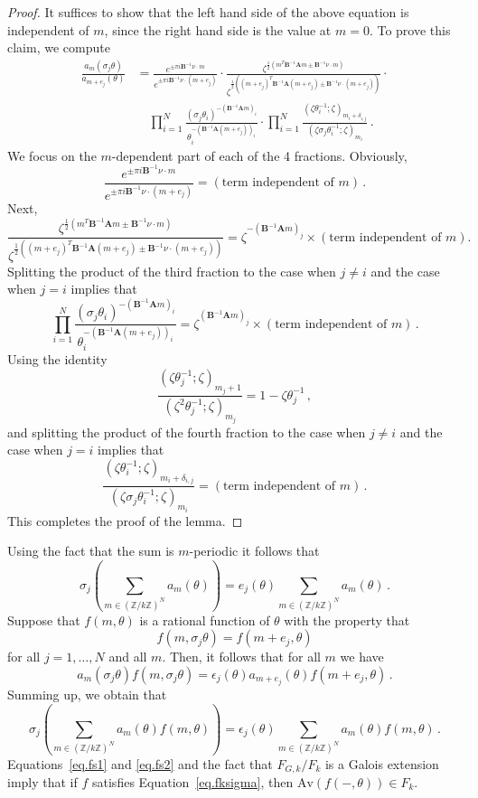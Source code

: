 \documentclass[12pt]{amsart}
\theoremstyle{definition}
\def\BZ{\mathbb Z}
\def\e{\epsilon}
\def\th{\theta}
\def\be{  \begin{equation} }
\def\ee{  \end{equation} }
\def\Av{\mathrm{Av}}
\newcommand{\mb}{\mathbf}
\begin{document}
\begin{proof}
It suffices to show that the left hand side of the above equation is
independent of $m$, since the right hand side is the value at $m=0$.
To prove this claim, we compute
\begin{align*}
\frac{a_{m}(\sigma_j\th)}{a_{m+e_j}(\th)} &=
\frac{e^{\pm \pi i \mb B^{-1}\nu \cdot m}}{
e^{\pm \pi i \mb B^{-1}\nu \cdot (m+e_j)}} \cdot
\frac{\zeta^{\frac12 \left(m^T\mb B^{-1}\mb A m \pm \mb B^{-1}\nu \cdot m\right)}}{
\zeta^{\frac12 \left((m+e_j)^T\mb B^{-1}\mb A (m+e_j) \pm \mb B^{-1}\nu \cdot (m+e_j)\right)}} 
\cdot \\ 
& \quad \prod_{i=1}^N \frac{(\sigma_j \th_i)^{-(\mb B^{-1} \mb A m)_i}}{
\th_i^{-(\mb B^{-1} \mb A (m+e_j))_i}} \cdot \prod_{i=1}^N
\frac{(\zeta \th_i^{-1};\zeta )_{m_i+\delta_{i,j}}}{
(\zeta \sigma_j \th_i^{-1};\zeta )_{m_i}}\,.
\end{align*}
We focus on the $m$-dependent part of each of the 4 fractions.
Obviously, 
$$
\frac{e^{\pm \pi i \mb B^{-1}\nu \cdot m}}{
e^{\pm \pi i \mb B^{-1}\nu \cdot (m+e_j)}} =
\left(\text{term independent of $m$}\right) \,.
$$
Next,
$$
\frac{\zeta^{\frac12 \left(m^T\mb B^{-1}\mb A m \pm \mb B^{-1}\nu 
\cdot m\right)}}{
\zeta^{\frac12 \left((m+e_j)^T\mb B^{-1}\mb A (m+e_j) \pm \mb B^{-1}\nu 
\cdot (m+e_j)\right)}} = \zeta^{-(\mb B^{-1}\mb A m)_j} \times 
\left(\text{term independent of $m$}\right).
$$
Splitting the product of the third fraction to the case when $j \neq i$
and the case when $j=i$ implies that
$$
\prod_{i=1}^N \frac{(\sigma_j \th_i)^{-(\mb B^{-1} \mb A m)_i}}{
\th_i^{-(\mb B^{-1} \mb A (m+e_j))_i}} 
= \zeta^{(\mb B^{-1}\mb A m)_j} \times 
\left(\text{term independent of $m$}\right) \,.
$$
Using the identity 
$$
\frac{(\zeta \th_j^{-1};\zeta)_{m_j+1}}{(\zeta^2 \th_j^{-1};\zeta)_{m_j}}=
1-\zeta \th_j^{-1} \,,
$$
and splitting the product of the fourth fraction to the case when $j \neq i$
and the case when $j=i$ implies that
$$
\frac{(\zeta \th_i^{-1};\zeta )_{m_i+\delta_{i,j}}}{
(\zeta \sigma_j \th_i^{-1};\zeta )_{m_i}} =
\left(\text{term independent of $m$}\right) \,.
$$
This completes the proof of the lemma.
\end{proof}

Using the fact that
the sum is $m$-periodic it follows that
\be
\label{eq.fs1}
\sigma_j \left( \sum_{m \in (\BZ/k\BZ)^N} a_m(\th) \right)= e_j(\th)
\sum_{m \in (\BZ/k\BZ)^N} a_m(\th)\,.
\ee
Suppose that
$f(m,\th)$ is a rational function of $\th$ with the property that 
\be
\label{eq.fksigma}
f(m,\sigma_j\th)=f(m+e_j,\th)
\ee
for all $j=1,\dots,N$ and all $m$. Then, it follows that for all $m$ we have
$$
a_m(\sigma_j \th) f(m,\sigma_j\th) = \e_j(\th) a_{m+e_j}(\th) f(m+e_j,\th) \,.
$$
Summing up, we obtain that 
\be
\label{eq.fs2}
\sigma_j \left( \sum_{m \in (\BZ/k\BZ)^N} a_m(\th) f(m,\th) \right)= \e_j(\th)
\sum_{m \in (\BZ/k\BZ)^N} a_m(\th) f(m,\th) \,.
\ee
Equations~\eqref{eq.fs1} and \eqref{eq.fs2} and the fact that $F_{G,k}/F_k$
is a Galois extension imply that if $f$ satisfies 
Equation~\eqref{eq.fksigma}, then 
$\Av(f(-,\theta))\in F_k$.
\end{document}
